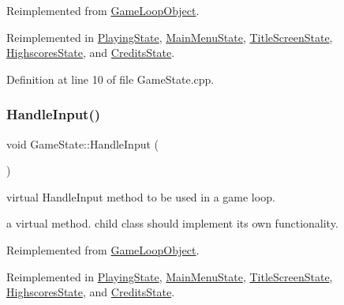 Reimplemented from \hyperlink{class_game_loop_object_a0572a88e5b98fa8a41078260d152202d}{Game\+Loop\+Object}.



Reimplemented in \hyperlink{class_playing_state_a6f5feffc1c6de994450828fbe2f5c173}{Playing\+State}, \hyperlink{class_main_menu_state_a6965e10d73953ef09c63a64685136307}{Main\+Menu\+State}, \hyperlink{class_title_screen_state_a1e1022947dac4a9b69c6bde57fe52217}{Title\+Screen\+State}, \hyperlink{class_highscores_state_a50fc2005675f2cc1740e3f9ef698bdab}{Highscores\+State}, and \hyperlink{class_credits_state_a085e7decf7f1fc7edae68db50851b84a}{Credits\+State}.



Definition at line 10 of file Game\+State.\+cpp.

\mbox{\label{class_game_state_a8bce2828cee99ae7c07322804531fd01}} 
\subsubsection{\texorpdfstring{Handle\+Input()}{HandleInput()}}
{\footnotesize\ttfamily void Game\+State\+::\+Handle\+Input (\begin{DoxyParamCaption}{ }\end{DoxyParamCaption})\hspace{0.3cm}{\ttfamily [virtual]}}



virtual Handle\+Input method to be used in a game loop. 

a virtual method. child class should implement its own functionality. 

Reimplemented from \hyperlink{class_game_loop_object_aecab111d504b7f4590045ca7c83a36de}{Game\+Loop\+Object}.



Reimplemented in \hyperlink{class_playing_state_ab61fc6f59f00ccf5db80f67d5e4c50a1}{Playing\+State}, \hyperlink{class_main_menu_state_ac332ae234d282f4e6657ee9d0685b7ff}{Main\+Menu\+State}, \hyperlink{class_title_screen_state_a1bad900daba7f6481632a58212f39af0}{Title\+Screen\+State}, \hyperlink{class_highscores_state_aa8ce1b29acad9790ff065e5c96635c85}{Highscores\+State}, and \hyperlink{class_credits_state_a63557b2290a2febb88e78ae90754a7ec}{Credits\+State}.



